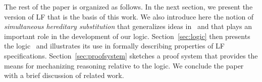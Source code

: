 The rest of the paper is organized as follows.
%
In the next section, we present the version of LF that is the basis of
this work.
%
We also introduce here the notion of  \emph{simultaneous
hereditary substitution} that generalizes ideas in~\cite{harper07jfp}
and that plays an important role in the development of our logic. 
%
Section~\ref{sec:logic} then presents the logic \logic\ and illustrates
its use in formally describing properties of LF specifications. 
%
Section~\ref{sec:proofsystem} sketches a proof system that provides
the means for mechanizing reasoning relative to the logic. 
%
We conclude the paper with a brief discussion of related work.
